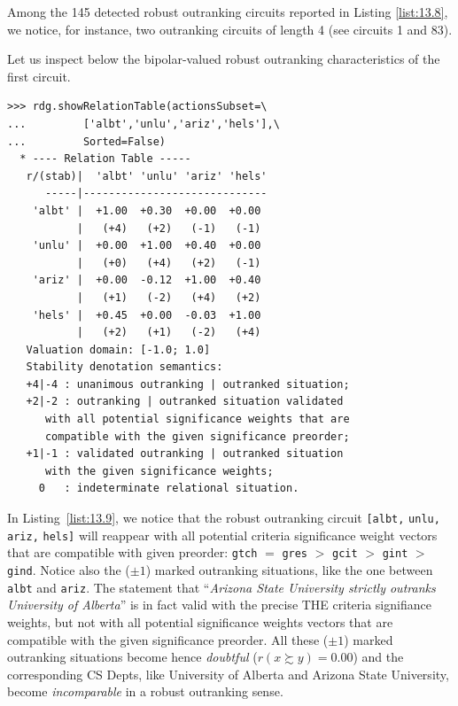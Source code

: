 Among the 145 detected robust outranking circuits reported in Listing \vref{list:13.8}, we notice, for instance, two outranking circuits of length 4 (see circuits 1 and 83).

Let us inspect below the bipolar-valued robust outranking characteristics of the first circuit.
\begin{lstlisting}[caption={Showing the relation table with stability denotation},label=list:13.9]
>>> rdg.showRelationTable(actionsSubset=\
...         ['albt','unlu','ariz','hels'],\
...         Sorted=False) 
  * ---- Relation Table -----
   r/(stab)|  'albt' 'unlu' 'ariz' 'hels'   
      -----|-----------------------------
    'albt' |  +1.00  +0.30  +0.00  +0.00  
           |   (+4)   (+2)   (-1)   (-1)  
    'unlu' |  +0.00  +1.00  +0.40  +0.00  
           |   (+0)   (+4)   (+2)   (-1)  
    'ariz' |  +0.00  -0.12  +1.00  +0.40  
           |   (+1)   (-2)   (+4)   (+2)  
    'hels' |  +0.45  +0.00  -0.03  +1.00  
           |   (+2)   (+1)   (-2)   (+4)  
   Valuation domain: [-1.0; 1.0]
   Stability denotation semantics:
   +4|-4 : unanimous outranking | outranked situation;
   +2|-2 : outranking | outranked situation validated
      with all potential significance weights that are
      compatible with the given significance preorder;
   +1|-1 : validated outranking | outranked situation
      with the given significance weights;
     0   : indeterminate relational situation.
\end{lstlisting}

In Listing~\vref{list:13.9}, we notice that the robust outranking circuit \texttt{[albt,} \texttt{unlu,} \texttt{ariz,} \texttt{hels]}  will reappear with all potential criteria significance weight vectors that are compatible with given preorder: \texttt{gtch} $=$ \texttt{gres} $>$ \texttt{gcit} $>$ \texttt{gint} $>$ \texttt{gind}. Notice also the ($\pm 1$) marked outranking situations, like the one between \texttt{albt} and \texttt{ariz}. The statement that ``\emph{Arizona State University strictly  outranks University of Alberta}'' is in fact valid with the precise THE criteria signifiance weights, but not with all potential significance weights vectors that are compatible with the given significance preorder. All these ($\pm 1$)  marked outranking situations become hence \emph{doubtful} ($r(x \succsim y) = 0.00$) and the corresponding CS Depts, like University of Alberta and Arizona State University, become \emph{incomparable} in a robust outranking sense.  

